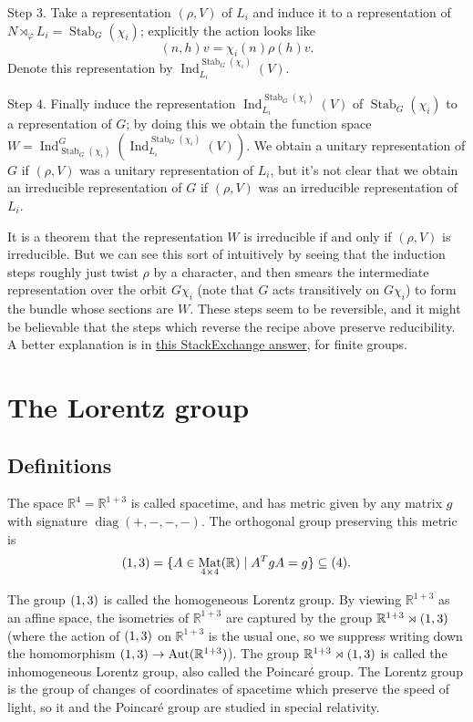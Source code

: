\documentclass[11pt,leqno]{article}
\theoremstyle{plain}
\theoremstyle{definition}
\numberwithin{equation}{section}
\numberwithin{lem}{section}
\DeclareMathOperator{\Stab}{Stab}
\DeclareMathOperator{\Ind}{Ind}
\DeclareMathOperator{\Aut}{Aut}
\DeclareMathOperator{\diag}{diag}
\DeclareMathOperator{\Mat}{Mat}
\let\O\relax
\DeclareMathOperator{\O}{O}
\begin{document}
Step 3. Take a representation $(\rho,V)$ of $L_i$ and induce it to a representation of $N\rtimes_\varphi L_i = \Stab_G(\chi_i)$; explicitly the action looks like 
\[(n,h)v = \chi_i(n)\rho(h)v.\]
Denote this representation by $\Ind_{L_i}^{\Stab_G(\chi_i)}(V)$.

Step 4. Finally induce the representation $\Ind_{L_i}^{\Stab_G(\chi_i)}(V)$ of $\Stab_G(\chi_i)$ to a representation of $G$; by doing this we obtain the function space $W = \Ind_{\Stab_G(\chi_i)}^G(\Ind_{L_i}^{\Stab_G(\chi_i)}(V))$. We obtain a unitary representation of $G$ if $(\rho,V)$ was a unitary representation of $L_i$, but it's not clear that we obtain an irreducible representation of $G$ if $(\rho,V)$ was an irreducible representation of $L_i$.

It is a theorem that the representation $W$ is irreducible if and only if $(\rho,V)$ is irreducible. But we can see this sort of intuitively by seeing that the induction steps roughly just twist $\rho$ by a character, and then smears the intermediate representation over the orbit $G\chi_i$ (note that $G$ acts transitively on $G\chi_i$) to form the bundle whose sections are $W$. These steps seem to be reversible, and it might be believable that the steps which reverse the recipe above preserve reducibility. A better explanation is in \href{https://math.stackexchange.com/a/5093490}{this StackExchange answer}, for finite groups.

\section{The Lorentz group}
\subsection{Definitions}
The space $\mathbb R^4 = \mathbb R^{1+3}$ is called spacetime, and has metric given by any matrix $g$ with signature $\diag(+,-,-,-)$. The orthogonal group preserving this metric is 
\[\O(1,3) = \{A\in \Mat_{4\times 4}(\mathbb R)\mid A^TgA = g\}\subseteq \O(4).\]

The group $\O(1,3)$ is called the homogeneous Lorentz group. By viewing $\mathbb R^{1+3}$ as an affine space, the isometries of $\mathbb R^{1+3}$ are captured by the group $\mathbb R^{1+3}\rtimes \O(1,3)$ (where the action of $\O(1,3)$ on $\mathbb R^{1+3}$ is the usual one, so we suppress writing down the homomorphism $\O(1,3)\to \Aut(\mathbb R^{1+3})$). The group $\mathbb R^{1+3}\rtimes \O(1,3)$ is called the inhomogeneous Lorentz group, also called the Poincar\'e group. The Lorentz group is the group of changes of coordinates of spacetime which preserve the speed of light, so it and the Poincar\'e group are studied in special relativity.
\end{document}
